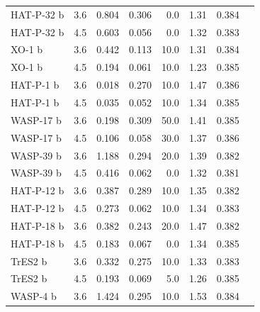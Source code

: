 \begin{subappendices}
{\begin{landscape}
\begin{longtable}[h]{llrrrrrr}
  HAT-P-32 b   &               3.6 &           0.804 &      0.306 &      0.0 &          1.31 &                0.384 \\
  HAT-P-32 b   &               4.5 &           0.603 &      0.056 &      0.0 &          1.32 &                0.383 \\
  XO-1 b      &               3.6 &           0.442 &      0.113 &     10.0 &          1.31 &                0.384 \\
  XO-1 b      &               4.5 &           0.194 &      0.061 &     10.0 &          1.23 &                0.385 \\
  HAT-P-1 b    &               3.6 &           0.018 &      0.270 &     10.0 &          1.47 &                0.386 \\
  HAT-P-1 b    &               4.5 &           0.035 &      0.052 &     10.0 &          1.34 &                0.385 \\
  WASP-17 b   &               3.6 &           0.198 &      0.309 &     50.0 &          1.41 &                0.385 \\
  WASP-17 b   &               4.5 &           0.106 &      0.058 &     30.0 &          1.37 &                0.386 \\
  WASP-39 b   &               3.6 &           1.188 &      0.294 &     20.0 &          1.39 &                0.382 \\
  WASP-39 b   &               4.5 &           0.416 &      0.062 &      0.0 &          1.32 &                0.381 \\
  HAT-P-12 b   &               3.6 &           0.387 &      0.289 &     10.0 &          1.35 &                0.382 \\
  HAT-P-12 b   &               4.5 &           0.273 &      0.062 &     10.0 &          1.34 &                0.383 \\
  HAT-P-18 b   &               3.6 &           0.382 &      0.243 &     20.0 &          1.47 &                0.382 \\
  HAT-P-18 b   &               4.5 &           0.183 &      0.067 &      0.0 &          1.34 &                0.385 \\
  TrES2 b    &               3.6 &           0.332 &      0.275 &     10.0 &          1.33 &                0.383 \\
  TrES2 b    &               4.5 &           0.193 &      0.069 &      5.0 &          1.26 &                0.385 \\
  WASP-4 b    &               3.6 &           1.424 &      0.295 &     10.0 &          1.53 &                0.384 \\

\end{longtable}
\end{landscape}}
\end{subappendices}
